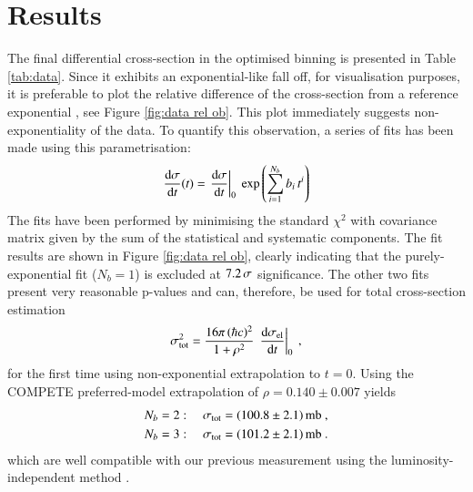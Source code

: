 \section{Results}


The final differential cross-section in the optimised binning is presented in Table \ref{tab:data}. Since it exhibits an exponential-like fall off, for visualisation purposes, it is preferable to plot the relative difference of the cross-section from a reference exponential%
, see Figure \ref{fig:data rel ob}. This plot immediately suggests non-exponentiality of the data. To quantify this observation, a series of fits has been made using this parametrisation:
\begin{equation}
\label{fit param}
{{\rm d}\sigma\over{\rm d}t}(t) = \left. {\rm d}\sigma\over{\rm d} t\right|_{0} \ \exp\left( \sum\limits_{i = 1}^{N_{b}} b_i\, t^i \right)
\end{equation}
The fits have been performed by minimising the standard $\chi^2$ with covariance matrix given by the sum of the statistical and systematic components. The fit results are shown in Figure \ref{fig:data rel ob}, clearly indicating that the purely-exponential fit ($N_b = 1$) is excluded at $7.2\,{\rm \sigma}$ significance. The other two fits present very reasonable p-values and can, therefore, be used for total cross-section estimation
\begin{equation}
\label{eq:si tot}
\sigma_{\rm tot}^2 = {16\pi\, (\hbar c)^2\over 1 + \rho^2}\, \left. {\rm d}\sigma_{\rm el}\over{\rm d} t\right|_0\ ,
\end{equation}
for the first time using non-exponential extrapolation to $t=0$. Using the COMPETE \cite{compete} preferred-model extrapolation of $\rho = 0.140\pm 0.007$ yields
\begin{equation}
\label{eq:si tot results}
	\begin{aligned}
		N_b &= 2:\quad \sigma_{\rm tot} = (100.8 \pm 2.1)\un{mb}\ ,\\	%
		N_b &= 3:\quad \sigma_{\rm tot} = (101.2 \pm 2.1)\un{mb}\ .\\	%
	\end{aligned}
\end{equation}
which are well compatible with our previous measurement using the luminosity-independent method \cite{prl111}.


